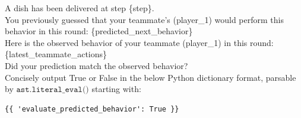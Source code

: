 \documentclass{article} %
\begin{document}
\begin{tcolorbox}[
    title={\small \textbf{Evaluate Predicted Behavior}},
    width=\linewidth, %
    fontupper=\fontsize{9pt}{11pt}\selectfont\ttfamily,
    before skip=10pt,
    after skip=0pt
]
A dish has been delivered at step \{step\}.\\
You previously guessed that your teammate's (player\_1) would perform this behavior in this round: \{predicted\_next\_behavior\}\\
Here is the observed behavior of your teammate (player\_1) in this round: \{latest\_teammate\_actions\}\\
Did your prediction match the observed behavior?\\
Concisely output True or False in the below Python dictionary format, parsable by $\texttt{ast.literal\_eval()}$ starting with:
\begin{verbatim}
{{ 'evaluate_predicted_behavior': True }}
\end{verbatim}
\end{tcolorbox}
\end{document}
